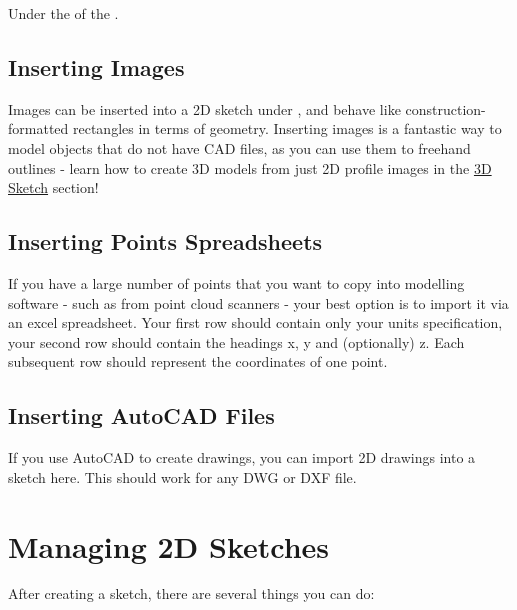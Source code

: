 \begin{enumerate}
\begin{where-to-find}
    Under the  of the .
    \end{where-to-find}
\subsection{Inserting Images}

Images can be inserted into a 2D sketch under , and behave like \newline construction-formatted rectangles in terms of geometry. Inserting images is a fantastic way to model objects that do not have CAD files, as you can use them to freehand outlines - learn how to create 3D models from just 2D profile images in the \hyperref[section: 3D Sketches]{3D Sketch} section!


\subsection{Inserting Points Spreadsheets}

\mediumdifficulty
If you have a large number of points that you want to copy into modelling software - such as from point cloud scanners - your best option is to import it via an excel spreadsheet. Your first row should contain only your units specification, your second row should contain the headings x, y and (optionally) z. Each subsequent row should represent the coordinates of one point.


\subsection{Inserting AutoCAD Files}
If you use AutoCAD to create drawings, you can import 2D drawings into a sketch here. This should work for any DWG or DXF file.

\section{Managing 2D Sketches}

\easydifficulty

After creating a sketch, there are several things you can do:


\end{enumerate}
